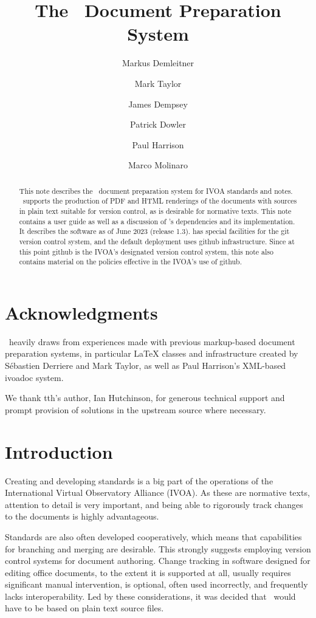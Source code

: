 \documentclass[11pt,a4paper]{ivoa}
\title{The \ivoatex\ Document Preparation System}
\author[http://www.ivoa.net/cgi-bin/twiki/bin/view/IVOA/MarkusDemleitner]{Markus Demleitner}
\author[http://www.ivoa.net/cgi-bin/twiki/bin/view/IVOA/MarkTaylor]{Mark Taylor}
\author[http://www.ivoa.net/cgi-bin/twiki/bin/view/IVOA/JamesDempsey]{James Dempsey}
\author[http://www.ivoa.net/cgi-bin/twiki/bin/view/IVOA/PatrickDowler]{Patrick Dowler}
\author[http://www.ivoa.net/cgi-bin/twiki/bin/view/IVOA/PaulHarrison]{Paul Harrison}
\author[http://www.ivoa.net/cgi-bin/twiki/bin/view/IVOA/MarcoMolinaro]{Marco Molinaro}
\begin{document}
\begin{abstract}
This note describes the \ivoatex\ document preparation system for IVOA
standards and notes.  \ivoatex\ supports the production of
PDF and HTML renderings of the documents with sources in
plain text suitable for version control, as is desirable for normative
texts.  This note contains a user guide as well as a discussion of
\ivoatex's dependencies and its implementation.  It describes the
software as of June 2023 (release 1.3).
\ivoatex{} has special facilities for the git version control system,
and the default deployment uses github infrastructure.  Since at this
point github is the IVOA's designated version control system, this note
also contains material on the policies effective in the IVOA's use of
github.

\end{abstract}


\section*{Acknowledgments}

\ivoatex\ heavily draws from experiences made with previous markup-based
document preparation systems, in particular LaTeX classes and
infrastructure created by S\'ebastien Derriere and Mark Taylor, as well
as Paul Harrison's XML-based ivoadoc system.

We thank tth's author, Ian Hutchinson, for generous technical support
and prompt provision of solutions in the upstream source where necessary.

\section{Introduction}

Creating and developing standards is a  big part of the operations of
the International Virtual Observatory Alliance (IVOA).
As these are normative texts, attention to detail is very important, and
being able to rigorously track changes to the documents is highly
advantageous.

Standards are also often developed cooperatively, which means that
capabilities for branching and merging are desirable.  This strongly
suggests employing version control systems for document authoring.
Change tracking in software designed for editing office documents, to
the extent it is supported at all, usually requires significant
manual intervention, is optional, often used incorrectly, and frequently
lacks interoperability.  Led by these considerations, it was decided that
\ivoatex\ would have to be based on plain text source files.
\end{document}
